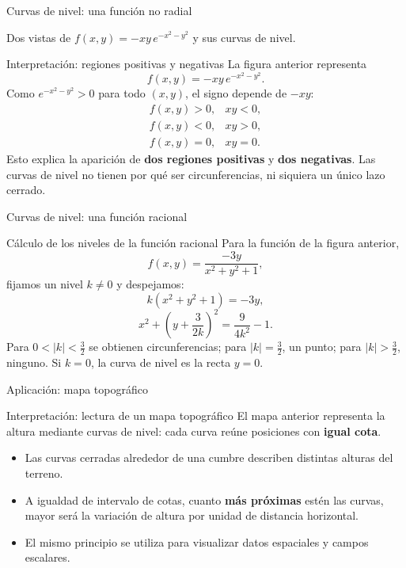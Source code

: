 \documentclass[main.tex]{subfiles}
\begin{document}
\begin{frame}{Curvas de nivel: una función no radial}
\begin{center}\scriptsize Dos vistas de $f(x,y)=-xy\,e^{-x^2-y^2}$ y sus curvas de nivel.\end{center}
\end{frame}
\begin{frame}{Interpretación: regiones positivas y negativas}
La figura anterior representa
\[
f(x,y)=-xy\,e^{-x^2-y^2}.
\]
\medskip
Como $e^{-x^2-y^2}>0$ para todo $(x,y)$, el signo depende de $-xy$:
\[
\begin{array}{ll}
f(x,y)>0,&xy<0,\\
f(x,y)<0,&xy>0,\\
f(x,y)=0,&xy=0.
\end{array}
\]
\medskip
Esto explica la aparición de \textbf{dos regiones positivas}
y \textbf{dos negativas}. Las curvas de nivel no tienen por qué
ser circunferencias, ni siquiera un único lazo cerrado.
\end{frame}

\begin{frame}{Curvas de nivel: una función racional}
\end{frame}
\begin{frame}{Cálculo de los niveles de la función racional}
Para la función de la figura anterior,
\[
f(x,y)=\frac{-3y}{x^2+y^2+1},
\]
fijamos un nivel $k\ne0$ y despejamos:
\[
k(x^2+y^2+1)=-3y,
\]
\[
\boxed{x^2+\left(y+\frac{3}{2k}\right)^2
=\frac{9}{4k^2}-1.}
\]
\small
Para $0<|k|<\frac32$ se obtienen circunferencias;
para $|k|=\frac32$, un punto; para $|k|>\frac32$, ninguno.
Si $k=0$, la curva de nivel es la recta $y=0$.
\end{frame}

\begin{frame}{Aplicación: mapa topográfico}
\end{frame}
\begin{frame}{Interpretación: lectura de un mapa topográfico}
El mapa anterior representa la altura mediante curvas de nivel:
cada curva reúne posiciones con \textbf{igual cota}.
\medskip
\begin{itemize}
\item Las curvas cerradas alrededor de una cumbre describen
distintas alturas del terreno.
\medskip
\item A igualdad de intervalo de cotas, cuanto \textbf{más próximas}
estén las curvas, mayor será la variación de altura por unidad
de distancia horizontal.
\medskip
\item El mismo principio se utiliza para visualizar datos
espaciales y campos escalares.
\end{itemize}
\end{frame}
\end{document}
